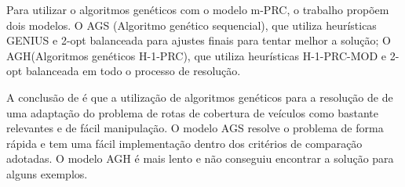 Para utilizar o algoritmos genéticos com o modelo m-PRC, o trabalho propõem dois modelos. O AGS (Algoritmo genético sequencial), que utiliza heurísticas GENIUS e 2-opt balanceada para ajustes finais para tentar melhor a solução; O AGH(Algoritmos genéticos H-1-PRC), que utiliza heurísticas H-1-PRC-MOD e 2-opt balanceada em todo o processo de resolução.

A conclusão de \cite{Washington} é que a utilização de algoritmos genéticos para a resolução de de uma adaptação do problema de rotas de cobertura de veículos como bastante relevantes e de fácil manipulação. O modelo AGS resolve o problema de forma rápida e tem uma fácil implementação dentro dos critérios de comparação adotadas. O modelo AGH é mais lento e não conseguiu encontrar a solução para alguns exemplos.


